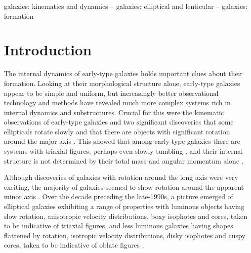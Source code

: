 \documentclass[usenatbib,usegraphicx]{mn2e}
\begin{document}
\begin{keywords} 
galaxies: kinematics and dynamics -- galaxies: elliptical and lenticular -- galaxies: formation
\end{keywords}

%
%

\section{Introduction}
\label{s:intro}

The internal dynamics of early-type galaxies holds important clues about their formation. Looking at their morphological structure alone, early-type galaxies appear to be simple and uniform, but increasingly better observational technology and methods have revealed much more complex systems rich in internal dynamics and substructures.  Crucial for this were the kinematic observations of early-type galaxies \citep{1977ApJ...218L..43I, 1983ApJ...266...41D, 1983ApJ...266..516D, 1988A&A...193L...7B,1990A&A...239...97B} and two significant discoveries that some ellipticals rotate slowly \citep{1975ApJ...200..439B,1977ApJ...218L..43I} and that there are objects with significant rotation around the major axis \citep{1986ApJ...303L..45D,1988ApJS...68..409D,1989ApJ...344..613F,1989AJ.....98..147J}. This showed that among early-type galaxies there are systems with triaxial figures, perhaps even slowly tumbling \citep{1982MNRAS.198..303V,1982ApJ...263..599S}, and their internal structure is not determined by their total mass and angular momentum alone \citep[see the review by][]{1991ARA&A..29..239D}. 

Although discoveries of galaxies with rotation around the long axis were very exciting, the majority of galaxies seemed to show rotation around the apparent minor axis \citep{1979ApJ...229..472S, 1980MNRAS.193..931E, 1983ApJ...266...41D,1983ApJ...265..664D, 1988ApJS...68..409D,1988A&A...202L...5B,1989ApJ...344..613F,1989AJ.....98..147J,1990A&A...239...97B,1994MNRAS.269..785B}. Over the decade preceding the late-1990s, a picture emerged of elliptical galaxies exhibiting a range of properties with luminous objects having slow rotation, anisotropic velocity distributions, boxy isophotes and cores, taken to be indicative of triaxial figures, and less luminous galaxies having shapes flattened by rotation, isotropic velocity distributions, disky isophotes and cuspy cores, taken to be indicative of oblate figures \citep[for a synthesis see][]{1996ApJ...464L.119K}. 
\end{document}
